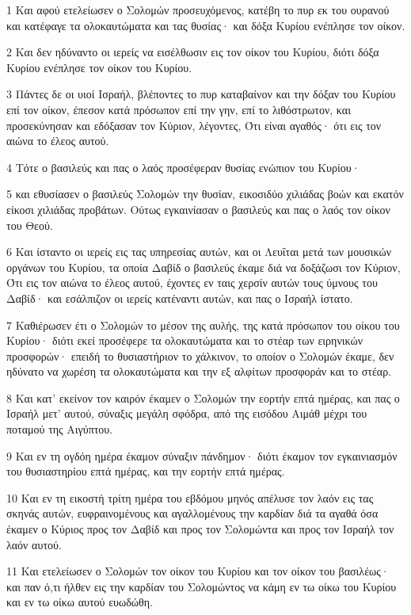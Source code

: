 \par 1 Και αφού ετελείωσεν ο Σολομών προσευχόμενος, κατέβη το πυρ εκ του ουρανού και κατέφαγε τα ολοκαυτώματα και τας θυσίας· και δόξα Κυρίου ενέπλησε τον οίκον.
\par 2 Και δεν ηδύναντο οι ιερείς να εισέλθωσιν εις τον οίκον του Κυρίου, διότι δόξα Κυρίου ενέπλησε τον οίκον του Κυρίου.
\par 3 Πάντες δε οι υιοί Ισραήλ, βλέποντες το πυρ καταβαίνον και την δόξαν του Κυρίου επί τον οίκον, έπεσον κατά πρόσωπον επί την γην, επί το λιθόστρωτον, και προσεκύνησαν και εδόξασαν τον Κύριον, λέγοντες, Ότι είναι αγαθός· ότι εις τον αιώνα το έλεος αυτού.
\par 4 Τότε ο βασιλεύς και πας ο λαός προσέφεραν θυσίας ενώπιον του Κυρίου·
\par 5 και εθυσίασεν ο βασιλεύς Σολομών την θυσίαν, εικοσιδύο χιλιάδας βοών και εκατόν είκοσι χιλιάδας προβάτων. Ούτως εγκαινίασαν ο βασιλεύς και πας ο λαός τον οίκον του Θεού.
\par 6 Και ίσταντο οι ιερείς εις τας υπηρεσίας αυτών, και οι Λευΐται μετά των μουσικών οργάνων του Κυρίου, τα οποία Δαβίδ ο βασιλεύς έκαμε διά να δοξάζωσι τον Κύριον, Ότι εις τον αιώνα το έλεος αυτού, έχοντες εν ταις χερσίν αυτών τους ύμνους του Δαβίδ· και εσάλπιζον οι ιερείς κατέναντι αυτών, και πας ο Ισραήλ ίστατο.
\par 7 Καθιέρωσεν έτι ο Σολομών το μέσον της αυλής, της κατά πρόσωπον του οίκου του Κυρίου· διότι εκεί προσέφερε τα ολοκαυτώματα και το στέαρ των ειρηνικών προσφορών· επειδή το θυσιαστήριον το χάλκινον, το οποίον ο Σολομών έκαμε, δεν ηδύνατο να χωρέση τα ολοκαυτώματα και την εξ αλφίτων προσφοράν και το στέαρ.
\par 8 Και κατ' εκείνον τον καιρόν έκαμεν ο Σολομών την εορτήν επτά ημέρας, και πας ο Ισραήλ μετ' αυτού, σύναξις μεγάλη σφόδρα, από της εισόδου Αιμάθ μέχρι του ποταμού της Αιγύπτου.
\par 9 Και εν τη ογδόη ημέρα έκαμον σύναξιν πάνδημον· διότι έκαμον τον εγκαινιασμόν του θυσιαστηρίου επτά ημέρας, και την εορτήν επτά ημέρας.
\par 10 Και εν τη εικοστή τρίτη ημέρα του εβδόμου μηνός απέλυσε τον λαόν εις τας σκηνάς αυτών, ευφραινομένους και αγαλλομένους την καρδίαν διά τα αγαθά όσα έκαμεν ο Κύριος προς τον Δαβίδ και προς τον Σολομώντα και προς τον Ισραήλ τον λαόν αυτού.
\par 11 Και ετελείωσεν ο Σολομών τον οίκον του Κυρίου και τον οίκον του βασιλέως· και παν ό,τι ήλθεν εις την καρδίαν του Σολομώντος να κάμη εν τω οίκω του Κυρίου και εν τω οίκω αυτού ευωδώθη.
